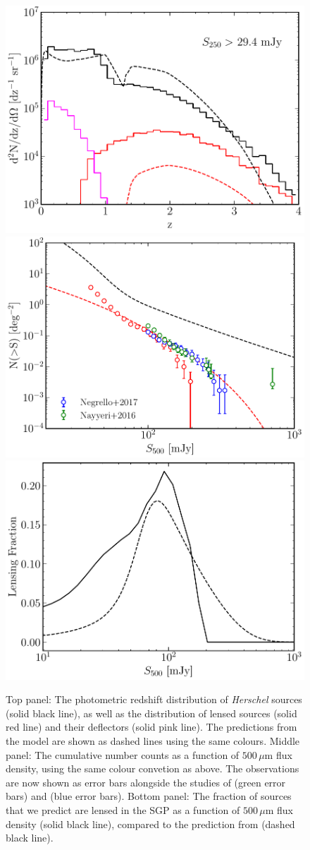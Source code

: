 \begin{figure}
    \centering
    \includegraphics[width=0.55\columnwidth,height=0.265\textheight]{Figures/lens_redshift_distribution.pdf}
    \includegraphics[width=0.55\columnwidth,height=0.265\textheight]{Figures/lens_number_counts.pdf}
    \includegraphics[width=0.55\columnwidth,height=0.265\textheight]{Figures/lensing_fraction.pdf}
    \caption[Comparison of our unlensed and lensed galaxy populations]{Top panel: The photometric redshift distribution of \textit{Herschel} sources (solid black line), as well as the distribution of lensed sources (solid red line) and their deflectors (solid pink line). The predictions from the \citealt{Cai_2013} model are shown as dashed lines using the same colours. Middle panel: The cumulative number counts as a function of $500\,\mu$m flux density, using the same colour convetion as above. The observations are now shown as error bars alongside the studies of \citealt{Nayyeri_2016} (green error bars) and \citealt{Negrello_2017} (blue error bars). Bottom panel: The fraction of sources that we predict are lensed in the SGP as a function of $500\,\mu$m flux density (solid black line), compared to the prediction from \citealt{Cai_2013} (dashed black line).
    \label{fig:lens_distributions_against_cai}}
\end{figure}

